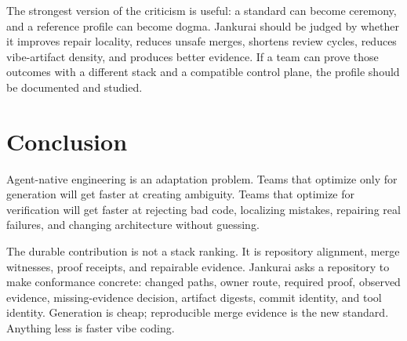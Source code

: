 The strongest version of the criticism is useful: a standard can become ceremony, and a reference profile can become dogma. Jankurai should be judged by whether it improves repair locality, reduces unsafe merges, shortens review cycles, reduces vibe-artifact density, and produces better evidence. If a team can prove those outcomes with a different stack and a compatible control plane, the profile should be documented and studied.

\section{Conclusion}

Agent-native engineering is an adaptation problem. Teams that optimize only for generation will get faster at creating ambiguity. Teams that optimize for verification will get faster at rejecting bad code, localizing mistakes, repairing real failures, and changing architecture without guessing.

The durable contribution is not a stack ranking. It is repository alignment, merge witnesses, proof receipts, and repairable evidence. Jankurai asks a repository to make conformance concrete: changed paths, owner route, required proof, observed evidence, missing-evidence decision, artifact digests, commit identity, and tool identity. Generation is cheap; reproducible merge evidence is the new standard. Anything less is faster vibe coding.
